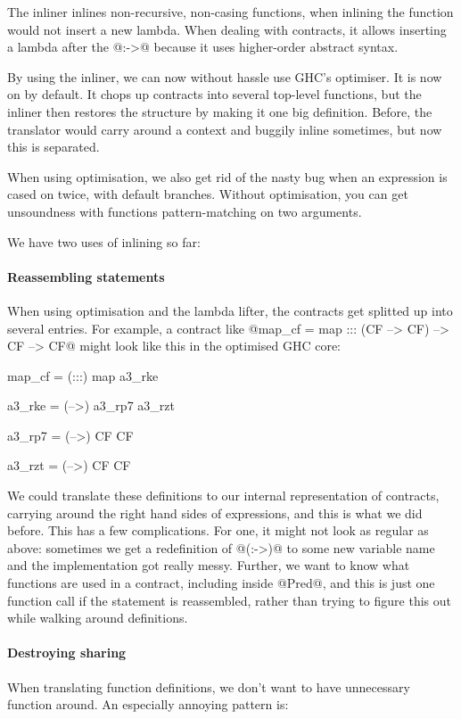 
The inliner inlines non-recursive, non-casing functions, when inlining
the function would not insert a new lambda.  When dealing with
contracts, it allows inserting a lambda after the @:->@ because it uses
higher-order abstract syntax.

By using the inliner, we can now without hassle use GHC's
optimiser. It is now on by default. It chops up contracts into several
top-level functions, but the inliner then restores the structure by
making it one big definition. Before, the translator would carry
around a context and buggily inline sometimes, but now this is
separated.

When using optimisation, we also get rid of the nasty bug when an expression
is cased on twice, with default branches. Without optimisation, you can get
unsoundness with functions pattern-matching on two arguments.

We have two uses of inlining so far:

\paragraph{Reassembling statements} When using optimisation and the
lambda lifter, the contracts get splitted up into several entries. For
example, a contract like @map_cf = map ::: (CF --> CF) --> CF --> CF@
might look like this in the optimised GHC core:

\begin{code}
map_cf = (:::) map a3_rke

a3_rke = (-->) a3_rp7 a3_rzt

a3_rp7 = (-->) CF CF

a3_rzt = (-->) CF CF
\end{code}

We could translate these definitions to our internal representation of
contracts, carrying around the right hand sides of expressions, and
this is what we did before. This has a few complications. For one,
it might not look as regular as above: sometimes we get a redefinition
of @(:->)@ to some new variable name and the implementation got really
messy. Further, we want to know what functions are used in a contract,
including inside @Pred@, and this is just one function call if the
statement is reassembled, rather than trying to figure this out while
walking around definitions.

\paragraph{Destroying sharing}
When translating function definitions, we don't want to have
unnecessary function around. An especially annoying pattern is:

